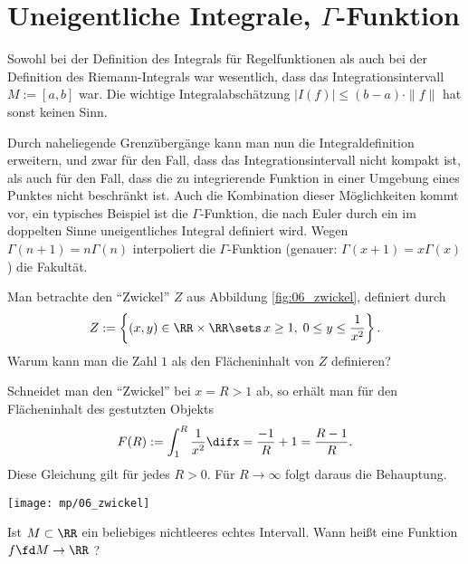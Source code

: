  \section{Uneigentliche Integrale, $\Gamma$-Funktion} 

  Sowohl bei der Definition des Integrals für Regelfunktionen als 
  auch bei der Definition des Riemann-Integrals war wesentlich, dass das 
  Integrationsintervall $M:=[a,b]$  war. Die 
  wichtige Integralabschätzung $|I(f)| \le (b-a)\cdot \|f\|$ hat sonst keinen 
  Sinn.

  Durch naheliegende Grenzübergänge kann man nun die Integraldefinition 
  erweitern, und zwar für den Fall, dass das Integrationsintervall nicht 
  kompakt ist, als auch für den Fall, dass die zu integrierende Funktion in 
  einer Umgebung eines Punktes nicht beschränkt ist. 
  Auch die Kombination dieser Möglichkeiten kommt vor, 
  ein typisches Beispiel ist die 
  $\Gamma$-Funktion, die nach Euler durch 
  ein im doppelten Sinne uneigentliches Integral definiert wird. Wegen 
  $\Gamma(n+1)=n\Gamma(n)$ interpoliert die $\Gamma$-Funktion (genauer: 
  $\Gamma(x+1)=x\Gamma(x)$) die Fakultät. 


  \begin{frage}
    \label{q:8_41}
    Man betrachte den "`Zwickel"' $Z$ aus Abbildung \ref{fig:06_zwickel}, 
    definiert durch  
    $$Z:=\left\{ (x,y)\in \RR\times\RR \sets \, x\ge 1, \; 0\le y \le 
      \frac{1}{x^2} \right\}.$$ 
    Warum kann man die Zahl $1$ als den Flächeninhalt von $Z$ definieren?
  \end{frage}

  \begin{antwort}
    Schneidet man den "`Zwickel"' bei $x=R>1$ ab, so erhält man für den 
    Flächeninhalt des gestutzten Objekts
    \[
    F(R) := \int_1^R \frac{1}{x^2} \difx = \frac{-1}{R}+1 = \frac{R-1}{R}.
    \]
    Diese Gleichung gilt für jedes $R>0$. Für $R\to\infty$ folgt daraus die 
    Behauptung. \AntEnd

    \begin{center}
      \texttt{[image: mp/06\_zwickel]}
      \label{fig:06_zwickel}
    \end{center}

  \end{antwort}

  \begin{frage}
    Ist $M\subset \RR$ ein beliebiges nichtleeres echtes Intervall. Wann 
    heißt eine Funktion $f\fd M\to\RR$ ?
  \end{frage}

